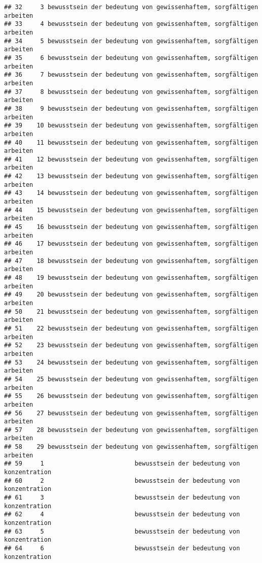 \documentclass[
]{article}
\begin{document}
\begin{verbatim}
## 32     3 bewusstsein der bedeutung von gewissenhaftem, sorgfältigen arbeiten
## 33     4 bewusstsein der bedeutung von gewissenhaftem, sorgfältigen arbeiten
## 34     5 bewusstsein der bedeutung von gewissenhaftem, sorgfältigen arbeiten
## 35     6 bewusstsein der bedeutung von gewissenhaftem, sorgfältigen arbeiten
## 36     7 bewusstsein der bedeutung von gewissenhaftem, sorgfältigen arbeiten
## 37     8 bewusstsein der bedeutung von gewissenhaftem, sorgfältigen arbeiten
## 38     9 bewusstsein der bedeutung von gewissenhaftem, sorgfältigen arbeiten
## 39    10 bewusstsein der bedeutung von gewissenhaftem, sorgfältigen arbeiten
## 40    11 bewusstsein der bedeutung von gewissenhaftem, sorgfältigen arbeiten
## 41    12 bewusstsein der bedeutung von gewissenhaftem, sorgfältigen arbeiten
## 42    13 bewusstsein der bedeutung von gewissenhaftem, sorgfältigen arbeiten
## 43    14 bewusstsein der bedeutung von gewissenhaftem, sorgfältigen arbeiten
## 44    15 bewusstsein der bedeutung von gewissenhaftem, sorgfältigen arbeiten
## 45    16 bewusstsein der bedeutung von gewissenhaftem, sorgfältigen arbeiten
## 46    17 bewusstsein der bedeutung von gewissenhaftem, sorgfältigen arbeiten
## 47    18 bewusstsein der bedeutung von gewissenhaftem, sorgfältigen arbeiten
## 48    19 bewusstsein der bedeutung von gewissenhaftem, sorgfältigen arbeiten
## 49    20 bewusstsein der bedeutung von gewissenhaftem, sorgfältigen arbeiten
## 50    21 bewusstsein der bedeutung von gewissenhaftem, sorgfältigen arbeiten
## 51    22 bewusstsein der bedeutung von gewissenhaftem, sorgfältigen arbeiten
## 52    23 bewusstsein der bedeutung von gewissenhaftem, sorgfältigen arbeiten
## 53    24 bewusstsein der bedeutung von gewissenhaftem, sorgfältigen arbeiten
## 54    25 bewusstsein der bedeutung von gewissenhaftem, sorgfältigen arbeiten
## 55    26 bewusstsein der bedeutung von gewissenhaftem, sorgfältigen arbeiten
## 56    27 bewusstsein der bedeutung von gewissenhaftem, sorgfältigen arbeiten
## 57    28 bewusstsein der bedeutung von gewissenhaftem, sorgfältigen arbeiten
## 58    29 bewusstsein der bedeutung von gewissenhaftem, sorgfältigen arbeiten
## 59     1                         bewusstsein der bedeutung von konzentration
## 60     2                         bewusstsein der bedeutung von konzentration
## 61     3                         bewusstsein der bedeutung von konzentration
## 62     4                         bewusstsein der bedeutung von konzentration
## 63     5                         bewusstsein der bedeutung von konzentration
## 64     6                         bewusstsein der bedeutung von konzentration

\end{verbatim}
\end{document}

